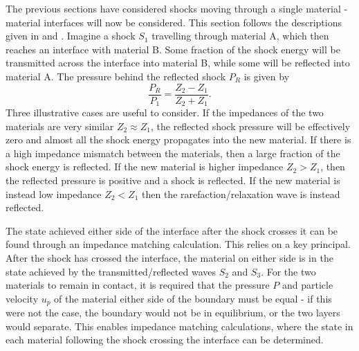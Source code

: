 The previous sections have considered shocks moving through a single material - material interfaces will now be considered. This section follows the descriptions given in \cite{Forbes2012} and \cite{Davison2008}. Imagine a shock $S_1$ travelling through material A, which then reaches an interface with material B. Some fraction of the shock energy will be transmitted across the interface into material B, while some will be reflected into material A. The pressure behind the reflected shock $P_R$ is given \cite{Colvin2013} by 
\begin{equation} \frac{P_R}{P_1} = \frac{Z_2 - Z_1}{Z_2 + Z_1}.  \end{equation}
Three illustrative cases are useful to consider. If the impedances of the two materials are very similar $Z_2 \approx Z_1$, the reflected shock pressure will be effectively zero and almost all the shock energy propagates into the new material. If there is a high impedance mismatch between the materials, then a large fraction of the shock energy is reflected. If the new material is higher impedance $Z_2 > Z_1$, then the reflected pressure is positive and a shock is reflected. If the new material is instead low impedance $Z_2 < Z_1$ then the rarefaction/relaxation wave is instead reflected.

The state achieved either side of the interface after the shock crosses it can be found through an impedance matching calculation. This relies on a key principal. After the shock has crossed the interface, the material on either side is in the state achieved by the transmitted/reflected waves $S_2$ and $S_3$. For the two materials to remain in contact, it is required that the pressure $P$ and particle velocity $u_p$ of the material either side of the boundary must be equal - if this were not the case, the boundary would not be in equilibrium, or the two layers would separate. This enables impedance matching calculations, where the state in each material following the shock crossing the interface can be determined.

